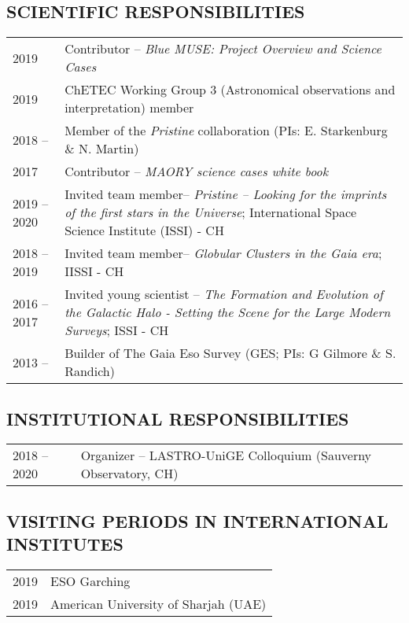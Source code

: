 \documentclass[ 11pt]{article}
\begin{document}
\subsection*{SCIENTIFIC RESPONSIBILITIES}
\begin{tabular}{p{2.5cm}p{13.5cm}}
2019     & Contributor -- {\em Blue MUSE: Project Overview and Science Cases}\\
2019      & ChETEC Working Group 3 (Astronomical observations and interpretation) member\\ 
2018 --  & Member of the {\em Pristine} collaboration (PIs: E. Starkenburg \& N. Martin)\\
2017     &  Contributor -- {\em MAORY science cases white book}\\
2019 -- 2020 &Invited team member-- {\em Pristine -- Looking for the imprints of the first stars in the Universe}; International Space Science Institute (ISSI) - CH \\
2018 -- 2019 & Invited team member-- {\em Globular Clusters in the Gaia era}; IISSI - CH\\
2016 -- 2017 & Invited young scientist -- {\em The Formation and Evolution of the Galactic Halo - Setting the Scene for the Large Modern Surveys}; ISSI - CH\\
2013 --         &   Builder of The Gaia Eso Survey (GES; PIs: G Gilmore \& S. Randich)\\

\end{tabular}


\subsection*{INSTITUTIONAL RESPONSIBILITIES}
\begin{tabular}{p{2.5cm}p{13.5cm}}
2018 -- 2020         & Organizer  -- LASTRO-UniGE Colloquium (Sauverny Observatory, CH)\\
\end{tabular}

\subsection*{VISITING PERIODS IN INTERNATIONAL INSTITUTES}
\begin{tabular}{p{2.5cm}p{13.5cm}}
2019           & ESO Garching\\
2019          & American University of Sharjah (UAE)\\
\end{tabular}
\end{document}
